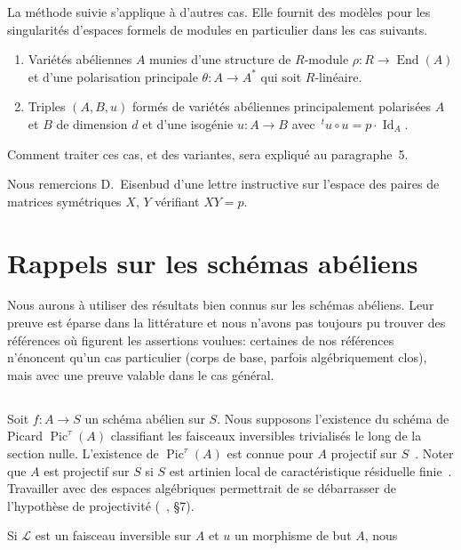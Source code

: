 \documentclass[11pt,a4paper]{article}
\theoremstyle{plain}
\theoremstyle{definition}
\DeclareMathOperator{\End}{End}
\DeclareMathOperator{\Pic}{Pic}
\begin{document}
La m\'ethode suivie s'applique \`a d'autres cas. Elle fournit des mod\`eles pour les
singularit\'es d'espaces formels de modules en particulier dans les cas suivants.
\begin{enumerate}[label=(\roman*)]
\item Vari\'et\'es ab\'eliennes $A$ munies d'une structure de $R$-module $\rho: R \to \End(A)$
et d'une polarisation principale $\theta: A \to A^*$ qui soit $R$-lin\'eaire.
\item Triples $(A, B, u)$ form\'es de vari\'et\'es ab\'eliennes principalement polaris\'ees $A$
et $B$ de dimension $d$ et d'une isog\'enie $u: A \to B$ avec $\,\!^t u \circ u = p \cdot \operatorname{Id}_A$.
\end{enumerate}
Comment traiter ces cas, et des variantes, sera expliqu\'e au paragraphe~5.

Nous remercions D.~Eisenbud d'une lettre instructive sur l'espace des paires
de matrices sym\'etriques $X$, $Y$ v\'erifiant $XY = p$.

\section{Rappels sur les sch\'emas ab\'eliens}

Nous aurons \`a utiliser des r\'esultats bien connus sur les sch\'emas ab\'eliens. Leur
preuve est \'eparse dans la litt\'erature et nous n'avons pas toujours pu trouver
des r\'ef\'erences o\`u figurent les assertions voulues: certaines de nos r\'ef\'erences
n'\'enoncent qu'un cas particulier (corps de base, parfois alg\'ebriquement clos),
mais avec une preuve valable dans le cas g\'en\'eral.

\subsection{}

Soit $f: A \to S$ un sch\'ema ab\'elien sur $S$. Nous supposons l'existence du
sch\'ema de Picard $\Pic^\tau(A)$ classifiant les faisceaux inversibles trivialis\'es le long
de la section nulle. L'existence de $\Pic^\tau(A)$ est connue pour $A$ projectif sur $S$~\cite{FGA}.
Noter que $A$ est projectif sur $S$ si $S$ est artinien local de caract\'eristique
r\'esiduelle finie~\cite{Oort}. Travailler avec des espaces alg\'ebriques permettrait de se
d\'ebarrasser de l'hypoth\`ese de projectivit\'e (~\cite{Artin}, \S7).

Si $\mathscr{L}$ est un faisceau inversible sur $A$ et $u$ un morphisme de but $A$, nous
\end{document}

